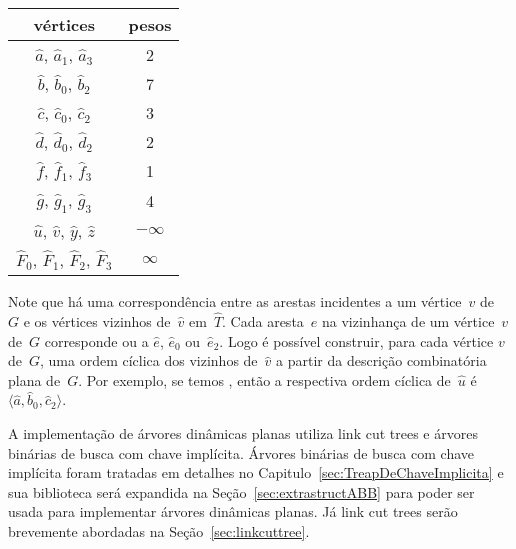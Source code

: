 \hspace{-.5cm}
\begin{minipage}[b]{0.2\textwidth}
\centering
\begin{tabular}{| c  c |} 
 \hline
 vértices & pesos\\
 \hline
 $\hat a$, $\hat a_1$, $\hat a_3$ & 2 \\ 
 \hline
 $\hat b$, $\hat b_0$, $\hat b_2$ & 7 \\
 \hline
 $\hat c$, $\hat c_0$, $\hat c_2$ & 3 \\
 \hline
 $\hat d$, $\hat d_0$, $\hat d_2$ & 2 \\
 \hline
 $\hat f$, $\hat f_1$, $\hat f_3$ & 1 \\
 \hline
 $\hat g$, $\hat g_1$, $\hat g_3$ & 4 \\
 \hline
 $\hat u$, $\hat v$, $\hat y$, $\hat z$ & $-\infty$ \\
 \hline
 $\hat F_0$, $\hat F_1$, $\hat F_2$, $\hat F_3$ & $\infty$ \\
 \hline
\end{tabular}
\end{minipage}
\hspace{1.5cm}
\begin{minipage}[b]{0.5\textwidth}
    \centering

\label{fig:MSF-figura-3}
    \end{minipage}

Note que há uma correspondência entre as arestas incidentes a um vértice~$v$ de~$G$ e os vértices vizinhos de~$\hat v$ em~$\hat T$.
Cada aresta~$e$ na vizinhança de um vértice~$v$ de~$G$ corresponde ou a $\hat e$, $\hat e_0$ ou~$\hat e_2$. 
Logo é possível construir, para cada vértice $v$ de~$G$, uma ordem cíclica dos vizinhos de~$\hat v$ a partir da descrição combinatória plana de~$G$.
Por exemplo, se temos , então a respectiva ordem cíclica de~$\hat u$ é~$\langle \hat a, \hat b_0, \hat c_2 \rangle$.



A implementação de árvores dinâmicas planas utiliza link cut trees e árvores binárias de busca com chave implícita.
Árvores binárias de busca com chave implícita foram tratadas em detalhes no Capitulo~\ref{sec:TreapDeChaveImplicita} e sua biblioteca será expandida na Seção~\ref{sec:extrastructABB} para poder ser usada para implementar árvores dinâmicas planas.
Já link cut trees serão brevemente abordadas na Seção~\ref{sec:linkcuttree}.

